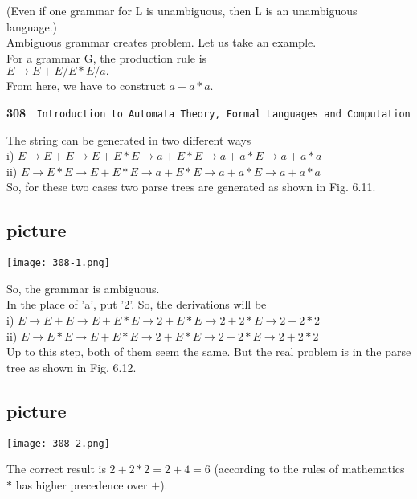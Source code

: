 \documentclass{article}
\begin{document}
\vspace*{0.3cm}
(Even if one grammar for L is unambiguous, then L is an unambiguous language.)\\
Ambiguous grammar creates problem. Let us take an example.\\
For a grammar G, the production rule is\\

\hspace*{4cm} $E \rightarrow E + E/E*E/a.$ \\

From here, we have to construct $a + a*a$.\\

\newpage
\begin{flushleft}
    \textbf{308}\hspace*{0.1cm} \textbf{$|$} \hspace*{0.1cm} \texttt{Introduction to Automata Theory, Formal Languages and Computation}
  \end{flushleft}

  \vspace*{0.5cm}
The string can be generated in two different ways\\

 i)  $E \rightarrow E + E \rightarrow E + E*E \rightarrow a + E*E \rightarrow a + a*E \rightarrow a + a*a$ \\
 ii) $E \rightarrow E*E \rightarrow E + E*E \rightarrow a + E*E \rightarrow a + a*E \rightarrow a + a*a$ \\

 So, for these two cases two parse trees are generated as shown in Fig. 6.11.\\

 \begin{center}
\section{picture}
\texttt{[image: 308-1.png]}
\end{center}


So, the grammar is ambiguous.\\
In the place of 'a', put '2'. So, the derivations will be\\
i) $E \rightarrow E + E \rightarrow E + E*E \rightarrow 2 + E*E \rightarrow 2 + 2*E \rightarrow 2 + 2*2$ \\
ii) $E \rightarrow E*E \rightarrow E + E*E \rightarrow 2 + E*E \rightarrow 2 + 2*E \rightarrow 2 + 2*2$ \\
Up to this step, both of them seem the same. But the real problem is in the parse tree as shown in Fig. 6.12.\\

\begin{center}
\section{picture}
\texttt{[image: 308-2.png]}
\end{center}


\hspace*{0.5cm} The correct result is $2 + 2*2 = 2 + 4 = 6$ (according to the rules of mathematics $*$ has higher precedence
over $+$).\\
\end{document}
